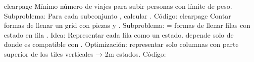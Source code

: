 {}\markdownRendererInterblockSeparator
{}\markdownRendererInterblockSeparator
{}\markdownRendererInterblockSeparator
{}\markdownRendererDollarSign{}\markdownRendererBackslash{}clearpage\markdownRendererDollarSign{}\markdownRendererInterblockSeparator
{}
\markdownRendererSectionEnd 
\markdownRendererSectionEnd \markdownRendererSectionBegin
{}\markdownRendererInterblockSeparator
{}\markdownRendererUlBeginTight
\markdownRendererUlItem Mínimo número de viajes para subir personas con límite de peso.\markdownRendererUlItemEnd 
\markdownRendererUlItem Subproblema: Para cada subconjunto , calcular .\markdownRendererUlItemEnd 
\markdownRendererUlEndTight \markdownRendererInterblockSeparator
{}Código:\markdownRendererInterblockSeparator
{}\markdownRendererParagraphSeparator
{}\markdownRendererDollarSign{}\markdownRendererBackslash{}clearpage\markdownRendererDollarSign{}\markdownRendererInterblockSeparator
{}
\markdownRendererSectionEnd \markdownRendererSectionBegin
{}\markdownRendererInterblockSeparator
{}\markdownRendererUlBeginTight
\markdownRendererUlItem Contar formas de llenar un grid  con piezas  y .\markdownRendererUlItemEnd 
\markdownRendererUlItem Subproblema:  = formas de llenar filas  con estado  en fila .\markdownRendererUlItemEnd 
\markdownRendererUlEndTight \markdownRendererInterblockSeparator
{}Idea:\markdownRendererInterblockSeparator
{}\markdownRendererUlBeginTight
\markdownRendererUlItem Representar cada fila como un estado.\markdownRendererUlItemEnd 
\markdownRendererUlItem {} depende solo de  donde  es compatible con .\markdownRendererUlItemEnd 
\markdownRendererUlItem Optimización: representar solo columnas con parte superior de los tiles verticales → 2\markdownRendererCircumflex{}m estados.\markdownRendererUlItemEnd 
\markdownRendererUlEndTight \markdownRendererInterblockSeparator
{}Código:\markdownRendererInterblockSeparator
{}
\markdownRendererSectionEnd 
\markdownRendererSectionEnd \markdownRendererDocumentEnd